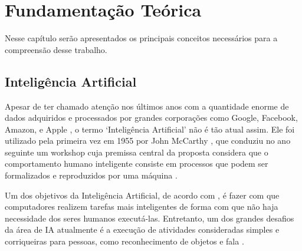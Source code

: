\chapter{Fundamentação Teórica} \label{cap:fund}

Nesse capítulo serão apresentados os principais conceitos necessários para a compreensão desse trabalho.
\section{Inteligência Artificial} \label{cap:fund-ia}

Apesar de ter chamado atenção nos últimos anos com a quantidade enorme de dados adquiridos e processados por grandes corporações como Google, Facebook, Amazon, e Apple \cite{ref:Lawless-Mittu-Sofge}, o termo `Inteligência Artificial' não é tão atual assim. Ele foi utilizado pela primeira vez em 1955 por John McCarthy \cite{ref:Cohen}, que conduziu no ano seguinte um workshop cuja premissa central da proposta considera que o comportamento humano inteligente consiste em processos que podem ser formalizados e reproduzidos por uma máquina \cite{ref:Harvard-AI}. %

Um dos objetivos da Inteligência Artificial, de acordo com , é fazer com que computadores realizem tarefas mais inteligentes de forma com que não haja necessidade dos seres humanos executá-las. Entretanto, um dos grandes desafios da área de IA atualmente é a execução de atividades consideradas simples e corriqueiras para pessoas, como reconhecimento de objetos e fala \cite{ref:Goodfellow-Bengio-Courville}.





